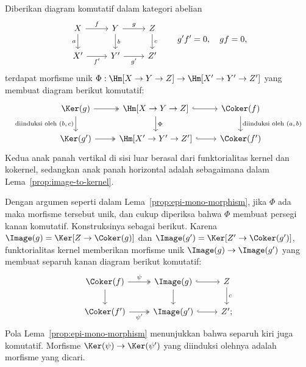 \begin{proposisi}\label{prop:homology-functoriality}
	Diberikan diagram komutatif dalam kategori abelian
	\[\begin{tikzcd}
		X \arrow[r, "f"] \arrow[d, "a"'] & Y \arrow[r, "g"] \arrow[d, "b"] & Z \arrow[d, "c"] \\
		X' \arrow[r, "{f'}"'] & Y' \arrow[r, "{g'}"'] & Z'
	\end{tikzcd} \qquad g'f' = 0, \quad gf = 0, \]
	terdapat morfisme unik
	$\Phi: \Hm[X \to Y \to Z] \to \Hm[X' \to Y' \to Z']$ yang membuat diagram
	berikut komutatif:
	\[\begin{tikzcd}
		\Ker(g) \arrow[twoheadrightarrow, r]  \arrow[d, "\text{diinduksi oleh $(b,c)$}"'] & {\Hm[X \to Y \to Z]} \arrow[hookrightarrow, r] \arrow[d, "\Phi"] & \Coker(f) \arrow[d, "\text{diinduksi oleh $(a,b)$}"] \\
		\Ker(g') \arrow[twoheadrightarrow, r] & {\Hm[X' \to Y' \to Z']} \arrow[hookrightarrow, r] & \Coker(f')
	\end{tikzcd}\]
	Kedua anak panah vertikal di sisi luar berasal dari funktorialitas kernel
	dan kokernel, sedangkan anak panah horizontal adalah sebagaimana dalam
	Lema~\ref{prop:image-to-kernel}.
\end{proposisi}

\begin{bukti}
	Dengan argumen seperti dalam
	Lema~\ref{prop:epi-mono-morphism}, jika $\Phi$ ada maka morfisme tersebut
	unik, dan cukup diperiksa bahwa $\Phi$ membuat persegi kanan komutatif.
	Konstruksinya sebagai berikut. Karena
	$\Image(g) = \Ker[Z \to \Coker(g)]$ dan
	$\Image(g') = \Ker[Z' \to \Coker(g')]$, funktorialitas kernel memberikan
	morfisme unik $\Image(g) \to \Image(g')$ yang membuat separuh kanan diagram
	berikut komutatif:
	\[\begin{tikzcd}
		\Coker(f) \arrow[d] \arrow[twoheadrightarrow, r, "\psi"] & \Image(g) \arrow[d] \arrow[hookrightarrow, r] & Z \arrow[d, "c"] \\
		\Coker(f') \arrow[twoheadrightarrow, r, "{\psi'}"'] & \Image(g') \arrow[hookrightarrow, r] & Z' ;
	\end{tikzcd}\]
	Pola Lema~\ref{prop:epi-mono-morphism} menunjukkan bahwa separuh kiri juga
	komutatif. Morfisme $\Ker(\psi) \to \Ker(\psi')$ yang diinduksi olehnya
	adalah morfisme yang dicari.
\end{bukti}


